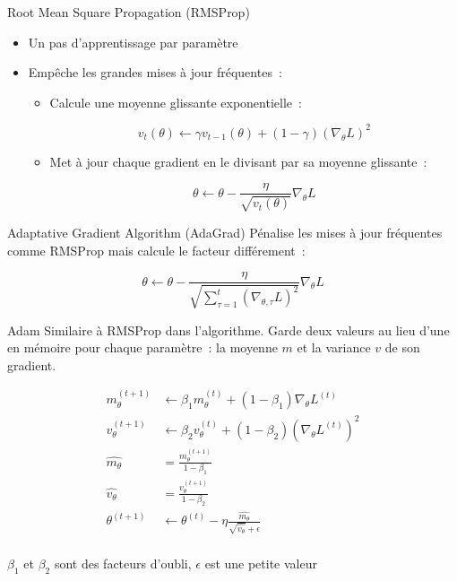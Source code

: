 \begin{frame}{Root Mean Square Propagation (RMSProp)}
  \begin{itemize}[<+->]
    \item Un pas d'apprentissage par paramètre
    \item Empêche les grandes mises à jour fréquentes~:
      \begin{itemize}
        \item Calcule une moyenne glissante exponentielle~:

        \[v_t(\theta) \leftarrow \gamma v_{t-1}(\theta) + (1 - \gamma)(\nabla_\theta L)^2\]

        \item Met à jour chaque gradient en le divisant par sa moyenne glissante~:

        \[\theta \leftarrow \theta - \frac{\eta}{\sqrt{v_t(\theta)}}\nabla_\theta L\]
      \end{itemize}
  \end{itemize}
\end{frame}

\begin{frame}{Adaptative Gradient Algorithm (AdaGrad)}
  Pénalise les mises à jour fréquentes comme RMSProp mais calcule le facteur différement~:

  \[
    \theta \leftarrow \theta - \frac{\eta}{\sqrt{\sum_{\tau=1}^t(\nabla_{\theta,\tau} L)^2}}\nabla_{\theta} L
  \]
\end{frame}

\begin{frame}{Adam}
  Similaire à RMSProp dans l'algorithme. Garde deux valeurs au lieu d'une en mémoire pour chaque paramètre~: la moyenne $m$ et la variance $v$ de son gradient.

  \begin{align*}
    m_\theta^{(t+1)} &\leftarrow \beta_1m_\theta^{(t)} + (1 - \beta_1)\nabla_\theta L^{(t)} \\
    v_\theta^{(t+1)} &\leftarrow \beta_2v_\theta^{(t)} + (1 - \beta_2)(\nabla_\theta L^{(t)})^2 \\
    \hat{m_\theta} &= \frac{m_\theta^{(t+1)}}{1 - \beta_1} \\
    \hat{v_\theta} &= \frac{v_\theta^{(t+1)}}{1 - \beta_2} \\
    \theta^{(t+1)} &\leftarrow \theta^{(t)} - \eta\frac{\hat{m_\theta}}{\sqrt{\hat{v_\theta}} + \epsilon} \\
  \end{align*}

  $\beta_1$ et $\beta_2$ sont des facteurs d'oubli, $\epsilon$ est une petite valeur
\end{frame}

